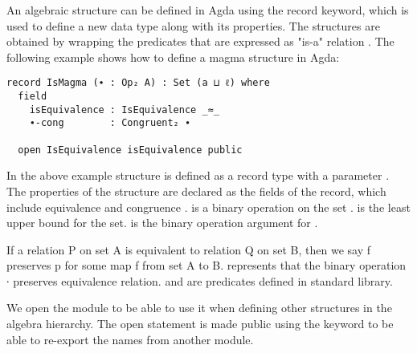 An algebraic structure can be defined in Agda using the record keyword, which is
used to define a new data type along with its properties. The structures are
obtained by wrapping the predicates that are expressed as "is-a" relation
\cite{hu2021formalizing}. The following example shows how to define a magma
structure in Agda:

\begin{verbatim}
record IsMagma (∙ : Op₂ A) : Set (a ⊔ ℓ) where
  field
    isEquivalence : IsEquivalence _≈_
    ∙-cong        : Congruent₂ ∙

  open IsEquivalence isEquivalence public
\end{verbatim}
In the above example structure  is defined as a record type with
a parameter . The properties of the structure  are
declared as the fields of the record, which include equivalence
 and congruence .  is a binary
operation on the set .  is the least upper bound for the
set.  is the binary operation argument for .

If a relation P on set A is equivalent to relation Q on set B, then we say f
preserves p for some map f from set A to B.  represents
that the binary operation ∙ preserves equivalence relation.
 and  are predicates defined in
standard library.

We open the module  to be able to use it when defining other
structures in the algebra hierarchy. The open statement is made public using the
keyword  to be able to re-export the names from another module.

